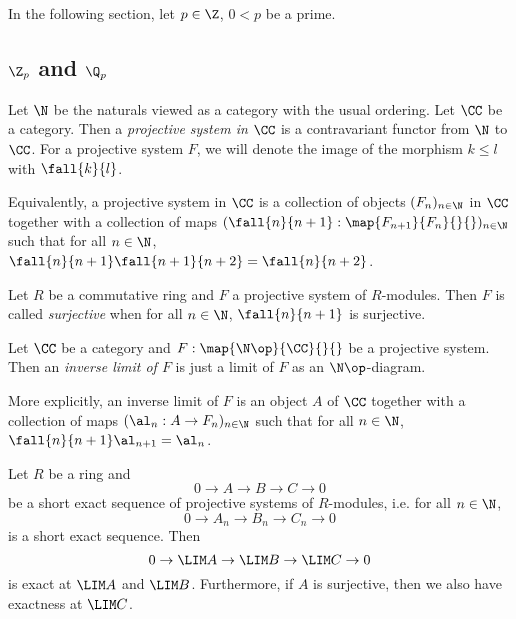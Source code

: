 In the following section, let $p \in \Z$, $0 < p$ be a prime. 

\subsection{\texorpdfstring{$\Z_p$ and $\Q_p$}{TEXT}}

\begin{dfn}
  
  Let $\N$ be the naturals viewed as a category with the usual ordering. 
  Let $\CC$ be a category. 
  Then a \emph{projective system in $\CC$} is a contravariant functor 
  from $\N$ to $\CC$. 
  For a projective system $F$, 
  we will denote the image of the morphism $k \leq l$ with $\fall{k}{l}$. 

  Equivalently, 
  a projective system in $\CC$ is 
  a collection of objects $(F_n)_{n\in\N}$ in $\CC$ together with
  a collection of maps $(\fall{n}{n+1} : \map{F_{n+1}}{F_n}{}{})_{n\in \N}$
  such that for all $n \in \N$, $\fall{n}{n+1}\fall{n+1}{n+2} = \fall{n}{n+2}$.
\end{dfn}

\begin{dfn}
  
  Let $R$ be a commutative ring and $F$ a projective system of $R$-modules. 
  Then $F$ is called \emph{surjective} when 
  for all $n \in \N$, $\fall{n}{n+1}$ is surjective. 
\end{dfn}

\begin{dfn}
  
  Let $\CC$ be a category and $F : \map{\N\op}{\CC}{}{}$ be a projective system.
  Then an \emph{inverse limit of $F$} is just 
  a limit of $F$ as an $\N\op$-diagram.

  More explicitly, an inverse limit of $F$ is 
  an object $A$ of $\CC$ together with a collection of maps 
  $(\al_n : A \to F_n)_{n\in\N}$ such that 
  for all $n \in \N$, $\fall{n}{n+1}\al_{n+1} = \al_n$. 
\end{dfn}

\begin{lem}
  
  Let $R$ be a ring and \[
    0 \to A \to B \to C \to 0
  \]
  be a short exact sequence of projective systems of $R$-modules,
  i.e. for all $n \in \N$, 
  \[
    0 \to A_n \to B_n \to C_n \to 0
  \]
  is a short exact sequence. 
  Then \[
    0 \to \LIM A \to \LIM B \to \LIM C \to 0
  \]
  is exact at $\LIM A$ and $\LIM B$. 
  Furthermore, if $A$ is surjective, 
  then we also have exactness at $\LIM C$. 

\end{lem}

